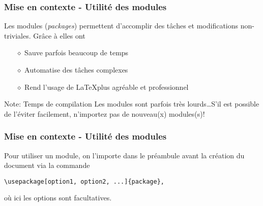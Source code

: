 
\begin{frame}
    \frametitle{Mise en contexte - Utilité des modules}
    Les modules (\textit{packages}) permettent d'accomplir
    des tâches et modifications non-triviales. Grâce à elles ont
    \vspace{0.3cm}
    \begin{itemize}
        \pause
        \item[$\diamond$] Sauve parfois beaucoup de temps
        \item[$\diamond$] Automatise des tâches complexes
        \item[$\diamond$] Rend l'usage de \LaTeX\;plus agréable et professionnel
    \end{itemize}
    \vfill
    \pause
    \begin{noteblock}{Note: Temps de compilation}
        Les modules sont parfois très lourds\dots\;S'il est possible de l'éviter
        facilement, n'importez pas de nouveau(x) modules(s)!
    \end{noteblock}
\end{frame}

\begin{frame}[fragile]
    \frametitle{Mise en contexte - Utilité des modules}
    Pour utiliser un module, on l'importe dans le préambule \textcolor{hard_green}{avant la création du
    document} via la commande
    \vfill
    \begin{lstlisting}[xleftmargin=-10mm]
        \usepackage[option1, option2, ...]{package},
    \end{lstlisting}
    \vfill
    où ici les options sont facultatives.
\end{frame}
